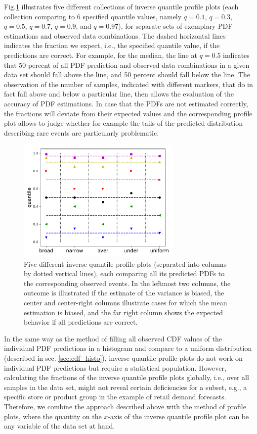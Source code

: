 \documentclass[BCOR=1mm, DIV=calc,10pt,
twoside=true,
twocolumn,
headings=normal]{scrartcl}
\newcommand{\fig}{Fig.}
\begin{document}
\fig \ref{fig:invquant_example} illustrates five different collections of inverse quantile profile plots (each collection comparing to 6 specified quantile values, namely $q = 0.1$, $q = 0.3$, $q = 0.5$, $q = 0.7$, $q = 0.9$, and $q = 0.97$), for separate sets of exemplary PDF estimations and observed data combinations. The dashed horizontal lines indicates the fraction we expect, i.e., the specified quantile value, if the predictions are correct. For example, for the median, the line at $q = 0.5$ indicates that  50 percent of all PDF prediction and observed data combinations in a given data set should fall above the line, and 50 percent should fall below the line. The observation of the number of samples, indicated with different markers, that do in fact fall above and below a particular line, then allows the evaluation of the accuracy of PDF estimations. In case that the PDFs are not estimated correctly, the fractions will deviate from their expected values and the corresponding profile plot allows to judge whether for example the tails of the predicted distribution describing rare events are particularly problematic.

\begin{figure}
\begin{center}
\includegraphics[width=8cm]{../figures/invquant_example}
\caption{\label{fig:invquant_example} Five different inverse quantile profile plots (separated into columns by dotted vertical lines), each comparing all its predicted PDFs to the corresponding observed events. In the leftmost two columns, the outcome is illustrated if the estimate of the variance is biased, the center and center-right columns illustrate cases for which the mean estimation is biased, and the far right column shows the expected behavior if all predictions are correct.}
\end{center}
\end{figure}

In the same way as the method of filling all observed CDF values of the individual PDF predictions in a histogram and compare to a uniform distribution (described in sec. \ref{sec:cdf_histo}), inverse quantile profile plots do not work on individual PDF predictions but require a statistical population. However, calculating the fractions of the inverse quantile profile plots globally, i.e., over all samples in the data set, might not reveal certain deficiencies for a subset, e.g., a specific store or product group in the example of retail demand forecasts. Therefore, we combine the approach described above with the method of profile plots, where the quantity on the $x$-axis of the inverse quantile profile plot can be any variable of the data set at hand. 
\end{document}
